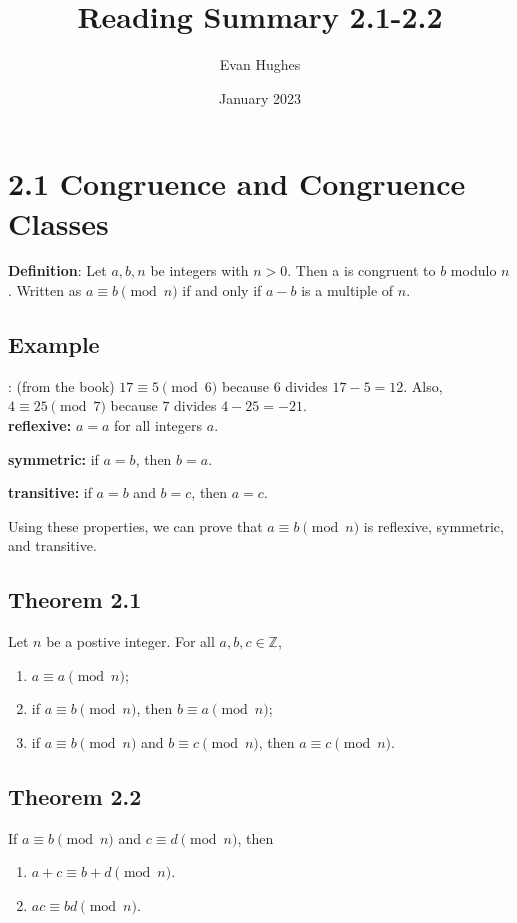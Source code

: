 \documentclass{article}
\title{Reading Summary 2.1-2.2}
\author{Evan Hughes}
\date{January 2023}
\begin{document}
\maketitle
\section*{2.1 Congruence and Congruence Classes}
\textbf{Definition}: Let $a, b, n$ be integers with $n>0$. Then a is congruent to $b$ modulo $n$. Written as $a \equiv b \pmod{n}$ if and only if $a-b$ is a multiple of $n$.\\

\subsection*{Example}: (from the book) $17 \equiv 5 \pmod{6}$ because $6$ divides $17-5=12$. Also, $4 \equiv 25 \pmod{7} $ because $7$ divides $4-25=-21$.\\

\textbf{reflexive:} $a=a$ for all integers $a$.

\textbf{symmetric:} if $a=b$, then $b=a$.

\textbf{transitive:} if $a=b$ and $b=c$, then $a=c$.

Using these properties, we can prove that $a \equiv b \pmod{n}$ is reflexive, symmetric, and transitive.\\

\subsection*{Theorem 2.1}

Let $n$ be a postive integer. For all $a,b,c \in \mathbb{Z}$,

\begin{enumerate}
    \item $a \equiv a \pmod{n}$;
    \item if $a \equiv b \pmod{n}$, then $b \equiv a \pmod{n}$;
    \item if $a \equiv b \pmod{n}$ and $b \equiv c \pmod{n}$, then $a \equiv c \pmod{n}$.
\end{enumerate}

\subsection*{Theorem 2.2}
If $a \equiv b \pmod{n}$ and $c \equiv d \pmod{n}$, then
\begin{enumerate}
    \item $a+c \equiv b+d \pmod{n}$.
    \item $ac \equiv bd \pmod{n}$.
\end{enumerate}
\end{document}
